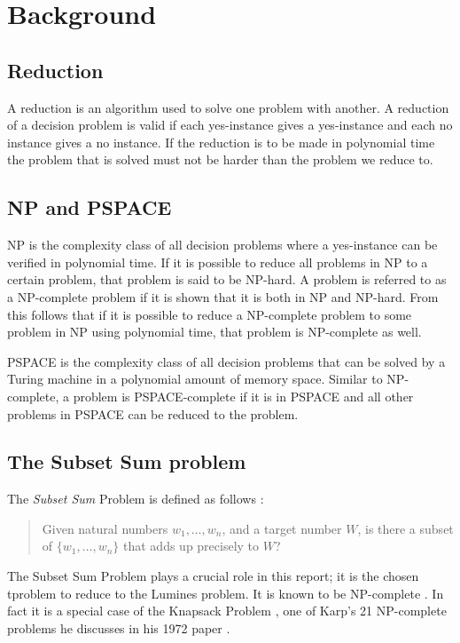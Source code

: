 \section{Background}

\subsection{Reduction}
A reduction is an algorithm used to solve one problem with another. A reduction of a decision problem is valid if each yes-instance gives a yes-instance and each no instance gives a no instance. If the reduction is to be made in polynomial time the problem that is solved must not be harder than the problem we reduce to.\cite{reduction}

\subsection{NP and PSPACE}
NP is the complexity class of all decision problems where a yes-instance can be verified in polynomial time. If it is possible to reduce all problems in NP to a certain problem, that problem is said to be NP-hard. A problem is referred to as a NP-complete problem if it is shown that it is both in NP and NP-hard. From this follows that if it is possible to reduce a NP-complete problem to some problem in NP using polynomial time, that problem is NP-complete as well.

PSPACE is the complexity class of all decision problems that can be solved by a Turing machine in a polynomial amount of memory space. Similar to NP-complete, a problem is PSPACE-complete if it is in PSPACE and all other problems in PSPACE can be reduced to the problem.

\subsection{The Subset Sum problem}

The \textit{Subset Sum} Problem is defined as follows \cite[p.~491]{algorithm}:

\begin{quote}
Given natural numbers $w_1, \ldots, w_n$, and a target number $W$, is there a subset of $\{w_1, \ldots, w_n \}$ that adds up precisely to $W$?
\end{quote}

The Subset Sum Problem plays a crucial role in this report; it is the chosen tproblem to reduce to the Lumines problem. It is known to be NP-complete \cite[p.~492]{algorithm}. In fact it is a special case of the Knapsack Problem \cite[p.~491]{algorithm}, one of Karp's 21 NP-complete problems he discusses in his 1972 paper \cite{karp}.

